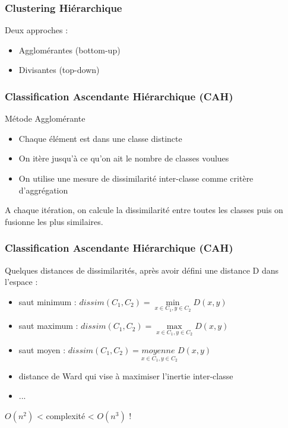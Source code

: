
\begin{frame}
  \frametitle{Clustering Hiérarchique}
  Deux approches :
  \begin{itemize}
  \item Agglomérantes (bottom-up)
  \item Divisantes (top-down)
  \end{itemize}
\end{frame}

\begin{frame}
  \frametitle{Classification Ascendante Hiérarchique (CAH)}
  Métode Agglomérante
  \begin{itemize}
  \item Chaque élément est dans une classe distincte
  \item On itère jusqu'à ce qu'on ait le nombre de classes voulues
  \item On utilise une mesure de dissimilarité inter-classe comme critère d'aggrégation
  \end{itemize}
  A chaque itération, on calcule la dissimilarité entre toutes les classes puis on fusionne les plus similaires.
\end{frame}

\begin{frame}
  \frametitle{Classification Ascendante Hiérarchique (CAH)}
  Quelques distances de dissimilarités, après avoir défini une distance D dans l'espace :
  \begin{itemize}
  \item saut minimum : $dissim(C_1,C_2) = \underset{x \in C_1,y \in C_2}{\min}{D(x,y)}$
  \item saut maximum : $dissim(C_1,C_2) = \underset{x \in C_1,y \in C_2}{\max}{D(x,y)}$
  \item saut moyen : $dissim(C_1,C_2) = \underset{x \in C_1,y \in C_2}{moyenne\;}{D(x,y)}$
  \item distance de Ward qui vise à maximiser l'inertie inter-classe
  \item ...
  \end{itemize}
  $O(n^2)$ < complexité < $O(n^3)$ !
\end{frame}
